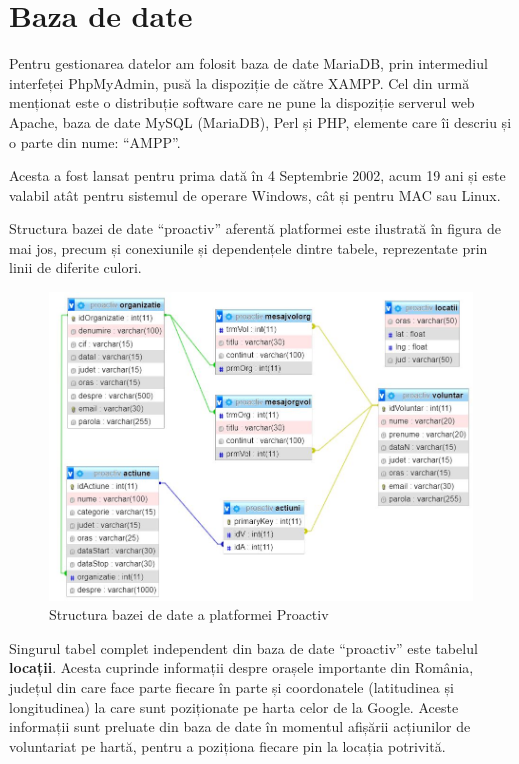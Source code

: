 \documentclass[12pt,a4paper]{report}
\begin{document}
\chapter{Baza de date}
\par
Pentru gestionarea datelor am folosit baza de date MariaDB, prin intermediul interfeței PhpMyAdmin, pusă la dispoziție de către XAMPP. Cel din urmă menționat este o distribuție software care ne pune la dispoziție serverul web Apache, baza de date MySQL (MariaDB), Perl și PHP, elemente care îi descriu și o parte din nume: “AMPP”. 
\par
Acesta a fost lansat pentru prima dată în 4 Septembrie 2002, acum 19 ani și este valabil atât pentru sistemul de operare Windows, cât și pentru MAC sau Linux.\cite{xampp}
\\\par
Structura bazei de date “proactiv” aferentă platformei este ilustrată în figura de mai jos, precum și conexiunile și dependențele dintre tabele, reprezentate prin linii de diferite culori.
\\
\begin{figure}[H]
\centering
  \includegraphics[width=1\linewidth]{./imagini/bazadate.jpg}
  \caption{Structura bazei de date a platformei Proactiv}
\end{figure}
\par
Singurul tabel complet independent din baza de date “proactiv” este tabelul \textbf{locații}. Acesta cuprinde informații despre orașele importante din România, județul din care face parte fiecare în parte și coordonatele (latitudinea și longitudinea) la care sunt poziționate pe harta celor de la Google. Aceste informații sunt preluate din baza de date în momentul afișării acțiunilor de voluntariat pe hartă, pentru a poziționa fiecare pin la locația potrivită.
\end{document}
